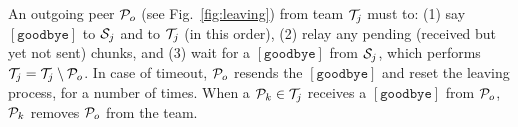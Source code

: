\begin{figure*}
  \caption{Peer leaving.\label{fig:leaving}}
\end{figure*}
An outgoing peer ${\cal P}_o$ (see Fig.~\ref{fig:leaving}) from team
${\cal T}_j$ must to: (1) say $[\mathtt{goodbye}]$ to ${\cal S}_j$ and
to ${\cal T}_j$
(in this order), (2) relay any pending (received but
yet not sent) chunks, and (3) wait for a $[\mathtt{goodbye}]$ from
${\cal S}_j$, which performs ${\cal T}_j = {\cal T}_j \setminus {\cal
  P}_o$. In case of timeout, ${\cal P}_o$ resends the
$[\mathtt{goodbye}]$ and reset the leaving process, for a number of
times. When a ${\cal P}_k\in {\cal T}_j$
receives a
$[\mathtt{goodbye}]$ from ${\cal P}_o$, ${\cal P}_k$ removes
${\cal P}_o$ from the team.

\begin{comment}
calls the Procedure \emph{Joining a
  team} (for $K=1$), to find a new neighbor. Finally, ${\cal S}_j$
sends to ${\cal P}_o$ a $[\mathtt{goodbye}]$ and performs ${\cal T}_j
= {\cal T}_j \setminus \{{\cal P}_o\}$.
\end{comment}
